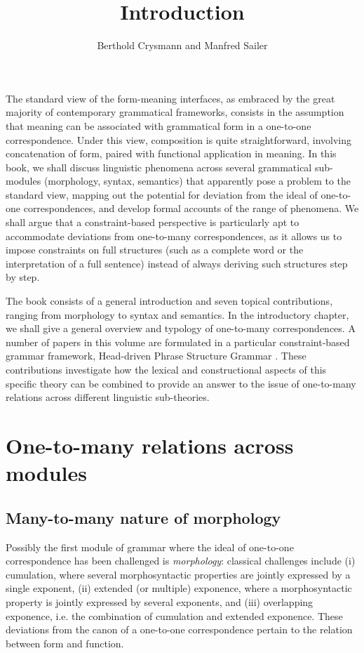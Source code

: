 \documentclass[output=paper]{langscibook}
\title{Introduction}
\author{Berthold Crysmann\affiliation{Université de Paris, Laboratoire de linguistique formelle, CNRS}  and Manfred Sailer\affiliation{Goethe-Universität Frankfurt a.M.}}
\begin{document}
\maketitle


\noindent The standard view of the form-meaning interfaces, as embraced by the
great majority of contemporary grammatical frameworks, consists in the
assumption that meaning can be associated with grammatical form in a
one-to-one correspondence. Under this view, composition is quite
straightforward, involving concatenation of form, paired with
functional application in meaning. In this book, we shall discuss
linguistic phenomena across several grammatical sub-modules
(morphology, syntax, semantics) that apparently pose a problem to the
standard view, mapping out the potential for deviation from the ideal
of one-to-one correspondences, and develop formal accounts of the
range of phenomena. We shall argue that a constraint-based perspective
is particularly apt to accommodate deviations from one-to-many
correspondences, as it allows us to impose constraints on full
structures (such as a complete word or the interpretation of a full
sentence) instead of always deriving such structures step by step.


The book consists of a general introduction and seven topical contributions, ranging from
morphology to syntax and semantics. In the introductory chapter, we
shall give a general overview and typology of one-to-many
correspondences. A number of papers in this volume are formulated in a
particular constraint-based grammar framework, Head-driven Phrase
Structure Grammar \citep{Pollard94}. These contributions investigate
how the lexical and constructional aspects of this specific theory can
be combined to provide an answer to the issue of one-to-many relations
across different linguistic sub-theories.


\section{One-to-many relations across modules}

\subsection{Many-to-many nature of morphology}

Possibly the first module of grammar where the ideal of one-to-one
correspondence has been challenged is \textit{morphology}: classical
challenges \citep{Matthews72} include (i) cumulation, where several
morphosyntactic properties are jointly expressed by a single exponent,
(ii) extended (or multiple) exponence, where a morphosyntactic
property is jointly expressed by several exponents, and (iii)
overlapping exponence, i.e. the combination of cumulation and extended
exponence. These deviations from the canon of a one-to-one
correspondence pertain to the relation between form and function.
\end{document}
